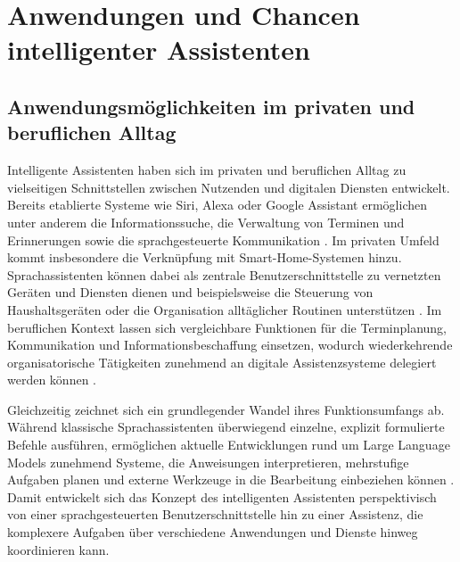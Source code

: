 \section{Anwendungen und Chancen intelligenter Assistenten}

\subsection{Anwendungsmöglichkeiten im privaten und beruflichen Alltag}

Intelligente Assistenten haben sich im privaten und beruflichen Alltag zu vielseitigen Schnittstellen zwischen Nutzenden und digitalen Diensten entwickelt. Bereits etablierte Systeme wie Siri, Alexa oder Google Assistant ermöglichen unter anderem die Informationssuche, die Verwaltung von Terminen und Erinnerungen sowie die sprachgesteuerte Kommunikation \cite{silva2020intelligent}. Im privaten Umfeld kommt insbesondere die Verknüpfung mit Smart-Home-Systemen hinzu. Sprachassistenten können dabei als zentrale Benutzerschnittstelle zu vernetzten Geräten und Diensten dienen und beispielsweise die Steuerung von Haushaltsgeräten oder die Organisation alltäglicher Routinen unterstützen \cite{minder2023voice}. Im beruflichen Kontext lassen sich vergleichbare Funktionen für die Terminplanung, Kommunikation und Informationsbeschaffung einsetzen, wodurch wiederkehrende organisatorische Tätigkeiten zunehmend an digitale Assistenzsysteme delegiert werden können \cite{silva2020intelligent}.

Gleichzeitig zeichnet sich ein grundlegender Wandel ihres Funktionsumfangs ab. Während klassische Sprachassistenten überwiegend einzelne, explizit formulierte Befehle ausführen, ermöglichen aktuelle Entwicklungen rund um Large Language Models zunehmend Systeme, die Anweisungen interpretieren, mehrstufige Aufgaben planen und externe Werkzeuge in die Bearbeitung einbeziehen können \cite{chowa2026language}. Damit entwickelt sich das Konzept des intelligenten Assistenten perspektivisch von einer sprachgesteuerten Benutzerschnittstelle hin zu einer Assistenz, die komplexere Aufgaben über verschiedene Anwendungen und Dienste hinweg koordinieren kann.